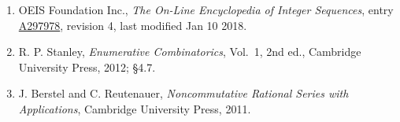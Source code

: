 \documentclass[11pt]{article}
\theoremstyle{definition}
\begin{document}
\begin{enumerate}

\item OEIS Foundation Inc., \emph{The On-Line Encyclopedia of Integer Sequences}, entry \href{https://oeis.org/A297978}{A297978}, revision 4, last modified Jan 10 2018.

\item R. P. Stanley, \emph{Enumerative Combinatorics}, Vol.~1, 2nd ed., Cambridge University Press, 2012; \S4.7.

\item J. Berstel and C. Reutenauer, \emph{Noncommutative Rational Series with Applications}, Cambridge University Press, 2011.

\end{enumerate}
\end{document}
